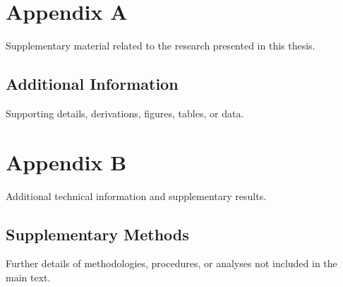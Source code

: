 \appendix

\chapter{Appendix A}
\label{app:a}

Supplementary material related to the research presented in this thesis.

\section{Additional Information}
Supporting details, derivations, figures, tables, or data.

\chapter{Appendix B}
\label{app:b}

Additional technical information and supplementary results.

\section{Supplementary Methods}
Further details of methodologies, procedures, or analyses not included in the main text.
